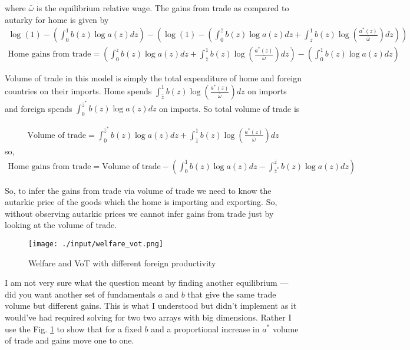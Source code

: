 \documentclass{report}
\numberwithin{equation}{section}
\numberwithin{figure}{section}
\numberwithin{table}{section}
\begin{document}
where $\bar \omega$ is the equilibrium relative wage. The gains from trade as compared to autarky for home is given by
\begin{align}
  \log(1) - \left( \int_0^1 b(z) \log a(z) dz \right)  - \left( \log(1) - \left( \int_0^{\bar z} b(z) \log a(z) dz + \int_{\bar z}^1 b(z) \log(\frac{a^*(z)}{\bar \omega}) dz \right) \right) \\
  \text{Home gains from trade} = \left( \int_0^{\bar z} b(z) \log a(z) dz + \int_{\bar z}^1 b(z) \log(\frac{a^*(z)}{\bar \omega}) dz \right)  - \left( \int_0^1 b(z) \log a(z) dz \right)
\end{align}

Volume of trade in this model is simply the total expenditure of home and foreign countries on their imports. Home spends $\int_{\bar z}^1 b(z) \log(\frac{a^*(z)}{\bar \omega}) dz $ on imports and foreign spends $\int_0^{\bar z^*} b(z) \log a(z) dz $ on imports. So total volume of trade is

\begin{align}
  \text{Volume of trade} =   \int_0^{\bar z^*} b(z) \log a(z) dz  + \int_{\bar z}^1 b(z) \log(\frac{a^*(z)}{\bar \omega}) dz
\end{align}
so,
\begin{align}
  \text{Home gains from trade}  = \text{Volume of trade} - \left( \int_0^1 b(z) \log a(z) dz - \int_{\bar z^*}^{\bar z} b(z) \log a(z) dz  \right)
\end{align}

So, to infer the gains from trade via volume of trade we need to know the autarkic price of the goods which the home is importing and exporting. So, without observing autarkic prices we cannot infer gains from trade just by looking at the volume of trade.

\begin{figure}[H]
  \centering
  \texttt{[image: ./input/welfare\_vot.png]}
  \caption{Welfare and VoT with different foreign productivity}
  \label{welfare_vot}
\end{figure}

I am not very sure what the question meant by finding another equilibrium — did you want another set of fundamentals $a$ and $b$ that give the same trade volume but different gains. This is what I understood but didn't implement as it would've had required solving for two two arrays with big dimensions. Rather I use the Fig. \ref{welfare_vot} to show that for a fixed $b$ and a proportional increase in $a^*$ volume of trade and gains move one to one.


\end{document}
